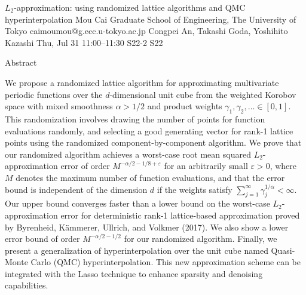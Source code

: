 \documentclass[12pt,lettersize,oneside]{book} %
\begin{document}
\begin{talk}
  {$L_2$-approximation: using randomized lattice algorithms and QMC hyperinterpolation}%
  {Mou Cai}%
  {Graduate School of Engineering, The University of Tokyo}%
  {caimoumou@g.ecc.u-tokyo.ac.jp}%
  {Congpei An, Takashi Goda, Yoshihito Kazashi}%
  {}%
  {Thu, Jul 31 11:00--11:30}%
  {S22-2}%
  {S22}%
  
    
Abstract

   
We propose a randomized lattice algorithm for approximating multivariate periodic functions over the $d$-dimensional unit cube from the weighted Korobov space with mixed smoothness $\alpha > 1/2$ and product weights $\gamma_1,\gamma_2,\ldots\in [0,1]$. This randomization involves drawing the number of points for function evaluations randomly, and selecting a good generating vector for rank-1 lattice points using the randomized component-by-component algorithm. We prove that our randomized algorithm achieves a worst-case root mean squared $L_2$-approximation error of order $M^{-\alpha/2 - 1/8 + \varepsilon}$ for an arbitrarily small $\varepsilon > 0$, where $M$ denotes the maximum number of function evaluations, and that the error bound is independent of the dimension $d$ if the weights satisfy $\sum_{j=1}^\infty \gamma_j^{1/\alpha} < \infty$. Our upper bound converges faster than a lower bound on the worst-case $L_2$-approximation error for deterministic rank-1 lattice-based approximation proved by Byrenheid, K\"{a}mmerer, Ullrich, and Volkmer (2017). We also show a lower error bound of order $M^{-\alpha/2-1/2}$ for our randomized algorithm. Finally, we present a generalization of hyperinterpolation over the unit cube named Quasi-Monte Carlo (QMC) hyperinterpolation. This new approximation scheme can be integrated with the Lasso technique to enhance sparsity and denoising capabilities.

\medskip


\end{talk}
\end{document}
